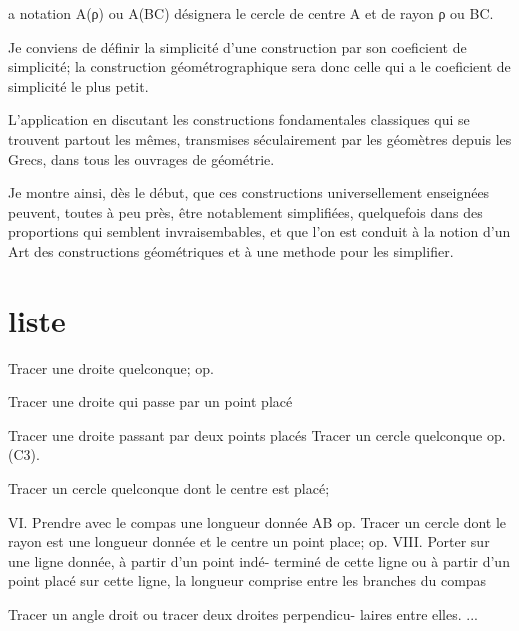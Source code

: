 \documentclass[12pt,a4paper]{book} %
\begin{document}
a notation A(ρ) ou A(BC) désignera le cercle de centre A et de rayon ρ ou BC.


Je conviens de définir la simplicité d'une construction par son coeficient de simplicité; la construction géométrographique sera donc celle qui a le coeficient de simplicité le plus petit.




 L'application en discutant les constructions fondamentales classiques qui se trouvent partout
les mêmes, transmises séculairement par les géomètres depuis
les Grecs, dans tous les ouvrages de géométrie.


Je montre ainsi, dès le début, que ces constructions universellement enseignées peuvent, toutes à peu près, être notablement simplifiées, quelquefois dans des proportions qui semblent invraisembables, et que l'on est conduit à la notion d'un Art des constructions géométriques et à une methode pour les simplifier.



\onecolumn
\section{liste}
Tracer une droite quelconque; op.

Tracer une droite qui passe par un point placé

Tracer une droite passant par deux points placés 
Tracer un cercle quelconque op. (C3).

Tracer un cercle quelconque dont le centre est placé;

VI. Prendre avec le compas une longueur donnée AB
op.
Tracer un cercle dont le rayon est une longueur donnée
et le centre un point place; op. 
VIII. Porter sur une ligne donnée, à partir d'un point indé-
terminé de cette ligne ou à partir d'un point placé
sur cette ligne, la longueur comprise entre les branches du compas

Tracer un angle droit ou tracer deux droites perpendicu-
laires entre elles.
...
\end{document}

